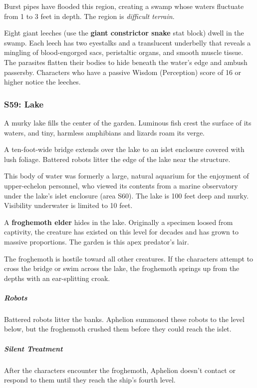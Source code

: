\documentclass[10pt,a4paper,twoside,bg=print,twocolumn,openany,nodeprecatedcode]{dndbook}
\begin{document}
Burst pipes have flooded this region, creating a swamp whose waters fluctuate from 1 to 3 feet in depth. The region is \textit{difficult terrain}.

Eight giant leeches (use the \textbf{giant constrictor snake} stat block) dwell in the swamp. Each leech has two eyestalks and a translucent underbelly that reveals a mingling of blood-engorged sacs, peristaltic organs, and smooth muscle tissue. The parasites flatten their bodies to hide beneath the water's edge and ambush passersby. Characters who have a passive Wisdom (Perception) score of 16 or higher notice the leeches.

\subsubsection{S59: Lake}
\begin{DndReadAloud}{}
A murky lake fills the center of the garden. Luminous fish crest the surface of its waters, and tiny, harmless amphibians and lizards roam its verge.

A ten-foot-wide bridge extends over the lake to an islet enclosure covered with lush foliage. Battered robots litter the edge of the lake near the structure.

\end{DndReadAloud}

This body of water was formerly a large, natural aquarium for the enjoyment of upper-echelon personnel, who viewed its contents from a marine observatory under the lake's islet enclosure (area S60). The lake is 100 feet deep and murky. Visibility underwater is limited to 10 feet.

A \textbf{froghemoth elder} hides in the lake. Originally a specimen loosed from captivity, the creature has existed on this level for decades and has grown to massive proportions. The garden is this apex predator's lair.

The froghemoth is hostile toward all other creatures. If the characters attempt to cross the bridge or swim across the lake, the froghemoth springs up from the depths with an ear-splitting croak.

\subparagraph{Robots}
Battered robots litter the banks. Aphelion summoned these robots to the level below, but the froghemoth crushed them before they could reach the islet.

\subparagraph{Silent Treatment}
After the characters encounter the froghemoth, Aphelion doesn't contact or respond to them until they reach the ship's fourth level.
\end{document}

